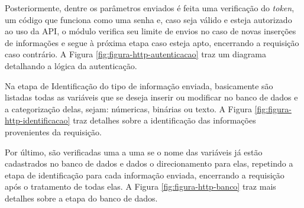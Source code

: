     	 Posteriormente, dentre os parâmetros enviados é feita uma verificação do \textit{token}, um código que funciona como uma senha e, caso seja válido e esteja autorizado ao uso da \gls{API}, o módulo verifica seu limite de envios no caso de novas inserções de informações e segue à próxima etapa caso esteja apto, encerrando a requisição caso contrário. A Figura \ref{fig:figura-http-autenticacao} traz um diagrama detalhando a lógica da autenticação.
    	
    	\begin{figure}[!h]
    	\end{figure}
    	
    	 Na etapa de Identificação do tipo de informação enviada, basicamente são listadas todas as variáveis que se deseja inserir ou modificar no banco de dados e a categorização delas, sejam: númericas, binárias ou texto. A Figura \ref{fig:figura-http-identificacao} traz detalhes sobre a identificação das informações provenientes da requisição.
    	
    	\begin{figure}[!h]
    	\end{figure}
    	
    	Por último, são verificadas uma a uma se o nome das variáveis já estão cadastrados no banco de dados e dados o direcionamento para elas, repetindo a etapa de identificação para cada informação enviada, encerrando a requisição após o tratamento de todas elas. A Figura \ref{fig:figura-http-banco} traz mais detalhes sobre a etapa do banco de dados.
    	
